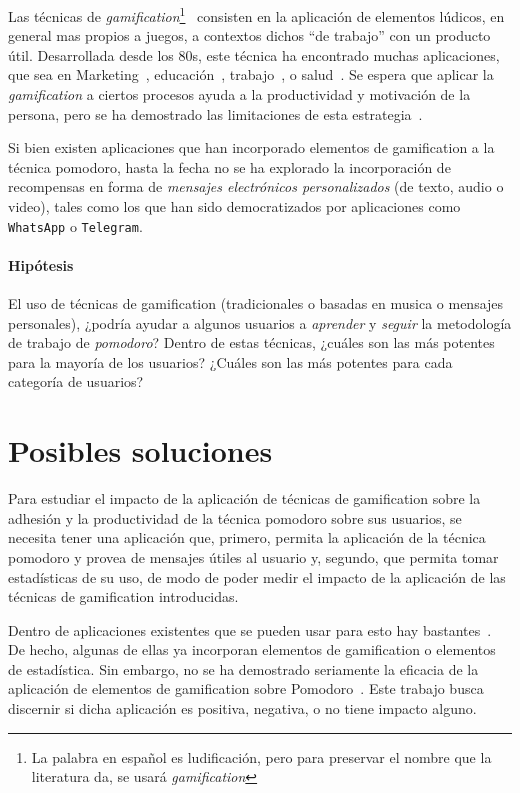 \documentclass[12pt,letterpaper]{report}
\let\oldparagraph\paragraph
\renewcommand{\paragraph}[1]{\oldparagraph{#1}\mbox{}}
\begin{document}
Las técnicas de \emph{gamification}\footnote{La palabra en español es ludificación, pero para preservar el nombre que la
literatura da, se usará \emph{gamification}}~\cite{deterding2011gamification} consisten en la aplicación de elementos
lúdicos, en general mas propios a juegos, a contextos dichos ``de trabajo'' con un producto útil.  Desarrollada desde
los 80s, este técnica ha encontrado muchas aplicaciones, que sea en Marketing~\cite{hamari2010game},
educación~\cite{desousa2014systematic-gamification}, trabajo~\cite{oravec2015gamification}, o
salud~\cite{pereira2014gamification-review}. Se espera que aplicar la \emph{gamification} a ciertos procesos ayuda a la
productividad y motivación de la persona, pero se ha demostrado las limitaciones de esta
estrategia~\cite{hamari2014gamification}.

Si bien existen aplicaciones que han incorporado elementos de gamification a la técnica pomodoro, hasta la fecha no se
ha explorado la incorporación de recompensas en forma de \emph{mensajes electrónicos personalizados} (de texto, audio o
video), tales como los que han sido democratizados por aplicaciones como \texttt{WhatsApp} o \texttt{Telegram}.

\paragraph{Hipótesis} El uso de técnicas de gamification (tradicionales o basadas en musica o mensajes personales),
¿podría ayudar a algunos usuarios a \emph{aprender} y \emph{seguir} la metodología de trabajo de \emph{pomodoro}? Dentro
de estas técnicas, ¿cuáles son las más potentes para la mayoría de los usuarios? ¿Cuáles son las más potentes para cada
categoría de usuarios?

\newpage
\section{Posibles soluciones}\label{posibles-soluciones}

Para estudiar el impacto de la aplicación de técnicas de gamification sobre la adhesión y la productividad de la técnica
pomodoro sobre sus usuarios, se necesita tener una aplicación que, primero, permita la aplicación de la técnica pomodoro
y provea de mensajes útiles al usuario y, segundo, que permita tomar estadísticas de su uso, de modo de poder medir el
impacto de la aplicación de las técnicas de gamification introducidas.

Dentro de aplicaciones existentes que se pueden usar para esto hay bastantes~\cite{forest-stayfocused, focus-extension,
pomodorium, teamviz}. De hecho, algunas de ellas ya incorporan elementos de gamification o elementos de estadística. Sin
embargo, no se ha demostrado seriamente la eficacia de la aplicación de elementos de gamification sobre
Pomodoro~\cite{hamari2014gamification}. Este trabajo busca discernir si dicha aplicación es positiva, negativa, o no
tiene impacto alguno.
\end{document}
